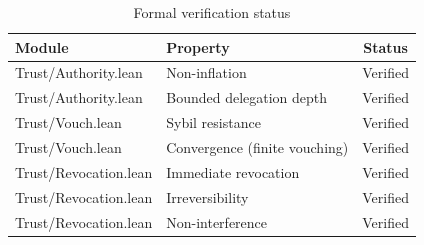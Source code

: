\begin{table}[h]
\centering
\begin{tabular}{llc}
\toprule
\textbf{Module} & \textbf{Property} & \textbf{Status} \\
\midrule
Trust/Authority.lean & Non-inflation & Verified \\
Trust/Authority.lean & Bounded delegation depth & Verified \\
Trust/Vouch.lean & Sybil resistance & Verified \\
Trust/Vouch.lean & Convergence (finite vouching) & Verified \\
Trust/Revocation.lean & Immediate revocation & Verified \\
Trust/Revocation.lean & Irreversibility & Verified \\
Trust/Revocation.lean & Non-interference & Verified \\
\bottomrule
\end{tabular}
\caption{Formal verification status}
\label{tab:verification}
\end{table}

